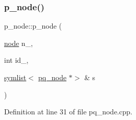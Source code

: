 \subsubsection{\texorpdfstring{p\+\_\+node()}{p\_node()}\hspace{0.1cm}{\footnotesize\ttfamily [2/2]}}
{\footnotesize\ttfamily p\+\_\+node\+::p\+\_\+node (\begin{DoxyParamCaption}\item[{\mbox{\hyperlink{classnode}{node}}}]{n\+\_\+,  }\item[{int}]{id\+\_\+,  }\item[{\mbox{\hyperlink{classsymlist}{symlist}}$<$ \mbox{\hyperlink{classpq__node}{pq\+\_\+node}} $\ast$$>$ \&}]{s }\end{DoxyParamCaption})\hspace{0.3cm}{\ttfamily [private]}}



Definition at line 31 of file pq\+\_\+node.\+cpp.



